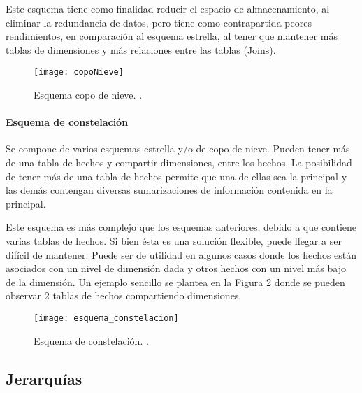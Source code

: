 \documentclass[a4paper,11pt]{article}
\begin{document}
    Este esquema tiene como finalidad reducir el espacio de almacenamiento, al eliminar la redundancia de datos, pero tiene como contrapartida
    peores rendimientos, en comparación al esquema estrella, al tener que mantener más tablas de dimensiones y más relaciones entre las tablas (Joins).
    
    \begin{figure}
      \begin{center}
        \texttt{[image: copoNieve]}
        \caption{Esquema copo de nieve. \cite[p.~39]{hefestov2}.}
        \label{snow_flk_sch}
      \end{center}
    \end{figure}
    
    
    \paragraph{Esquema de constelación}
    
    Se compone de varios esquemas estrella y/o de copo de nieve. Pueden tener más de una tabla de hechos y compartir dimensiones, entre los hechos.
    La posibilidad de tener más de una tabla de hechos permite que una de ellas sea la principal y las demás contengan diversas sumarizaciones de información
    contenida en la principal.
    
    Este esquema es más complejo que los esquemas anteriores, debido a que contiene varias tablas de hechos. Si bien ésta es una solución flexible, puede 
    llegar a ser difícil de mantener. Puede ser de utilidad en algunos casos donde los hechos están asociados con un nivel de dimensión dada y otros hechos 
    con un nivel más bajo de la dimensión. Un ejemplo sencillo se plantea en la Figura \ref{const_sch} donde se pueden observar 2 tablas de hechos 
    compartiendo dimensiones.
    
    \begin{figure}
      \begin{center}
        \texttt{[image: esquema\_constelacion]}
        \caption{Esquema de constelación. \cite[p.~41]{hefestov2}.}
        \label{const_sch}
      \end{center}
    \end{figure}
    
    
    \subsection{Jerarquías} \label{seccion_jerarquias}
    
\end{document}
